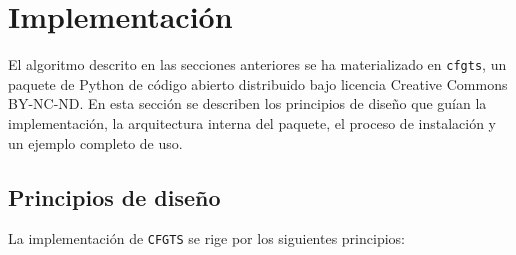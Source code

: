 \documentclass[12pt]{report} %
\begin{document}
\section{Implementación}

El algoritmo descrito en las secciones anteriores se ha materializado en \texttt{cfgts}, un paquete de Python de código abierto distribuido bajo licencia Creative Commons BY-NC-ND. En esta sección se describen los principios de diseño que guían la implementación, la arquitectura interna del paquete, el proceso de instalación y un ejemplo completo de uso.

\subsection{Principios de diseño}

La implementación de \texttt{CFGTS} se rige por los siguientes principios:
\end{document}
